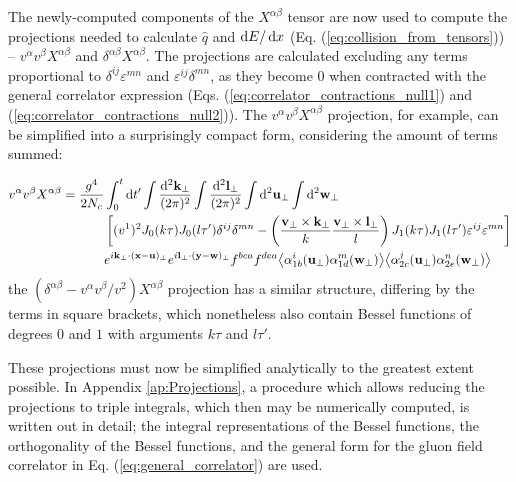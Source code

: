 
The newly-computed components of the $X^{\alpha \beta}$ tensor are now used to compute the projections needed to calculate $\hat{q}$ and $\mathop{}\!\mathrm{d} E / \mathop{}\!\mathrm{d} x$ (Eq. (\ref{eq:collision_from_tensors})) -- $v^\alpha v^\beta X^{\alpha \beta}$ and $\delta^{\alpha \beta} X^{\alpha \beta}$. The projections are calculated excluding any terms proportional to $\delta^{ij}\varepsilon^{mn}$ and $\varepsilon^{ij}\delta^{mn}$, as they become $0$ when contracted with the general correlator expression (Eqs. (\ref{eq:correlator_contractions_null1}) and (\ref{eq:correlator_contractions_null2})). The $v^\alpha v^\beta X^{\alpha \beta}$ projection, for example, can be simplified into a surprisingly compact form, considering the amount of terms summed:

\begin{equation}
\begin{split}
v^\alpha v^\beta X^{\alpha \beta} = \frac{g^4}{2N_c} & \int_0^t \mathop{}\!\mathrm{d} t' \int \frac{\mathop{}\!\mathrm{d}^2 \mathbf{k_\perp}}{(2\pi)^2}
\int \frac{\mathop{}\!\mathrm{d}^2 \mathbf{l}_\perp}{(2\pi)^2}
\int \mathop{}\!\mathrm{d}^2 \mathbf{u}_\perp
 \int \mathop{}\!\mathrm{d}^2 \mathbf{w}_\perp  
\\
& \left[ (v^1)^2 J_0 (k \tau) J_0(l\tau') \delta^{ij} \delta^{mn} - \left(\frac{\mathbf{v}_\perp \times \mathbf{k}_\perp}{k}\frac{\mathbf{v}_\perp \times \mathbf{l}_\perp}{l}\right) J_1 (k \tau) J_1(l\tau') \varepsilon^{ij} \varepsilon^{mn} \right]
\\
& e^{i \mathbf{k}_\perp \cdot (\mathbf{x} - \mathbf{u})_\perp}
e^{i \mathbf{l}_\perp \cdot (\mathbf{y} - \mathbf{w})_\perp}
f^{bca} f^{dea}
 \big< \alpha^i_{1b} (\mathbf{u}_\perp) \alpha^m_{1d} (\mathbf{w}_\perp) \big>
 \big< \alpha^j_{2c} (\mathbf{u}_\perp) \alpha^n_{2e} (\mathbf{w}_\perp) \big>
\end{split} 
\end{equation}
the $( \delta^{\alpha \beta} - v^\alpha v^\beta / v^2)X^{\alpha \beta}$ projection has a similar structure, differing by the terms in square brackets, which nonetheless also contain Bessel functions of degrees $0$ and $1$ with arguments $k\tau$ and $l\tau'$. 

These projections must now be simplified analytically to the greatest extent possible. In Appendix \ref{ap:Projections}, a procedure which allows reducing the projections to triple integrals, which then may be numerically computed, is written out in detail; the integral representations of the Bessel functions, the orthogonality of the Bessel functions, and the general form for the gluon field correlator in Eq. (\ref{eq:general_correlator}) are used.



